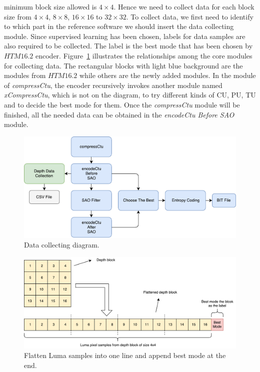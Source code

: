 minimum block size allowed is \(4\times4\).
Hence we need to collect data for each block size from 
\(4\times4\), \(8\times8\), \(16\times16\) to \(32\times32\).
To collect data, we first need to identify
to which part in the reference software
we should insert the data collecting module.
Since supervised learning has been chosen,
labels for data samples are also required to be collected.
The label is the best mode that has been chosen by \(HTM16.2\) encoder.
Figure~\ref{fig:data-collection-diagram} illustrates
the relationships among the core modules for collecting data.
The rectangular blocks with light blue background are the modules from
\(HTM16.2\) while others are the newly added modules.
In the module of \emph{compressCtu}, the encoder recursively invokes 
another module named \emph{xCompressCtu}, which is not on the diagram, to
try different kinds of CU, PU, TU and to decide the best mode for them.
Once the \emph{compressCtu} module will be finished, all the needed
data can be obtained in the \emph{encodeCtu Before SAO} module.
\begin{figure}
    \centering
    \includegraphics[width=\textwidth,height=\textheight,keepaspectratio]{Figures/thesis-data-collecting-diagram.pdf}
    \caption[Data collecting diagram]{Data collecting diagram.}
    \label{fig:data-collection-diagram}
\end{figure}
\begin{figure}
    \centering
    \includegraphics[width=\textwidth,height=\textheight,keepaspectratio]{Figures/flatten-pixels-into-single-line.pdf}
    \caption[Flatten Luma samples into one line and append best mode at the end]{Flatten Luma samples into one line and append best mode at the end.}\label{fig:flattern-data-into-one-dimension}
\end{figure}
